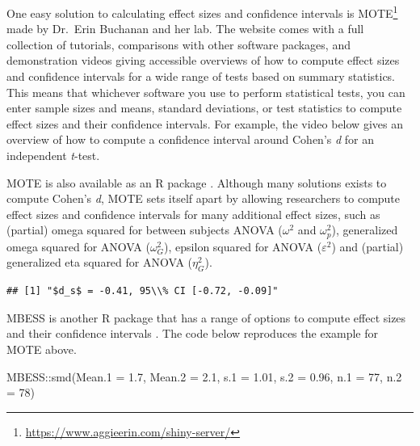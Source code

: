 \documentclass[
  oneside]{krantz}
\makeatletter
\newenvironment{Shaded}{\begin{snugshade}}{\end{snugshade}}
\newcommand{\AttributeTok}[1]{\textcolor[rgb]{0.61,0.61,0.61}{#1}}
\newcommand{\DecValTok}[1]{\textcolor[rgb]{0.06,0.06,0.06}{#1}}
\newcommand{\FloatTok}[1]{\textcolor[rgb]{0.06,0.06,0.06}{#1}}
\newcommand{\FunctionTok}[1]{\textcolor[rgb]{0,0,0}{#1}}
\newcommand{\NormalTok}[1]{#1}
\newcommand{\SpecialCharTok}[1]{\textcolor[rgb]{0,0,0}{#1}}
\renewcommand{\href}[2]{#2\footnote{\url{#1}}}
\newenvironment{kframe}{%
\medskip{}
\setlength{\fboxsep}{.8em}
 \def\at@end@of@kframe{}%
 \ifinner\ifhmode%
  \def\at@end@of@kframe{\end{minipage}}%
  \begin{minipage}{\columnwidth}%
 \fi\fi%
 \def\FrameCommand##1{\hskip\@totalleftmargin \hskip-\fboxsep
 \colorbox{shadecolor}{##1}\hskip-\fboxsep
     \hskip-\linewidth \hskip-\@totalleftmargin \hskip\columnwidth}%
 \MakeFramed {\advance\hsize-\width
   \@totalleftmargin\z@ \linewidth\hsize
   \@setminipage}}%
 {\par\unskip\endMakeFramed%
 \at@end@of@kframe}
\renewenvironment{Shaded}{\begin{kframe}}{\end{kframe}}
\makeatother
\begin{document}
One easy solution to calculating effect sizes and confidence intervals is \href{https://www.aggieerin.com/shiny-server/}{MOTE} made by Dr.~Erin Buchanan and her lab. The website comes with a full collection of tutorials, comparisons with other software packages, and demonstration videos giving accessible overviews of how to compute effect sizes and confidence intervals for a wide range of tests based on summary statistics. This means that whichever software you use to perform statistical tests, you can enter sample sizes and means, standard deviations, or test statistics to compute effect sizes and their confidence intervals. For example, the video below gives an overview of how to compute a confidence interval around Cohen's \emph{d} for an independent \emph{t}-test.

MOTE is also available as an R package \citep{buchanan_mote_2017}. Although many solutions exists to compute Cohen's \emph{d}, MOTE sets itself apart by allowing researchers to compute effect sizes and confidence intervals for many additional effect sizes, such as (partial) omega squared for between subjects ANOVA (\(\omega^{2}\) and \(\omega^{2}_p\)), generalized omega squared for ANOVA (\(\omega^{2}_G\)), epsilon squared for ANOVA (\(\varepsilon^{2}\)) and (partial) generalized eta squared for ANOVA (\(\eta^{2}_G\)).

\begin{Shaded}
\end{Shaded}

\begin{verbatim}
## [1] "$d_s$ = -0.41, 95\\% CI [-0.72, -0.09]"
\end{verbatim}

MBESS is another R package that has a range of options to compute effect sizes and their confidence intervals \citep{kelley_confidence_2007}. The code below reproduces the example for MOTE above.

\begin{Shaded}
\begin{Highlighting}[]
\NormalTok{MBESS}\SpecialCharTok{::}\FunctionTok{smd}\NormalTok{(}\AttributeTok{Mean.1 =} \FloatTok{1.7}\NormalTok{, }\AttributeTok{Mean.2 =} \FloatTok{2.1}\NormalTok{, }\AttributeTok{s.1 =} \FloatTok{1.01}\NormalTok{, }\AttributeTok{s.2 =} \FloatTok{0.96}\NormalTok{, }\AttributeTok{n.1 =} \DecValTok{77}\NormalTok{, }\AttributeTok{n.2 =} \DecValTok{78}\NormalTok{)}
\end{Highlighting}
\end{Shaded}
\end{document}
